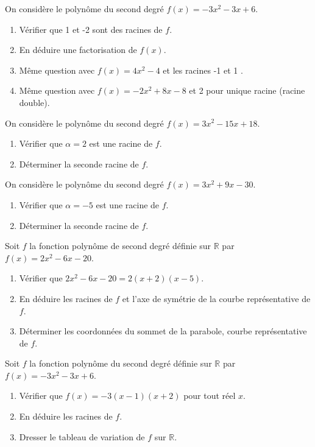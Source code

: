 \documentclass[french]{book}
\begin{document}
\begin{exocor}
On considère le polynôme du second degré $f(x)=-3 x^{2}-3 x+6$.

\begin{enumerate}
\item Vérifier que 1 et -2 sont des racines de $f$. 
\item En déduire une factorisation de $f(x)$.
\item Même question avec $f(x)=4 x^{2}-4$ et les racines -1 et 1 .
\item Même question avec $f(x)=-2 x^{2}+8 x-8$ et 2 pour unique racine (racine double).
\end{enumerate}
\end{exocor}

\begin{exocor}
On considère le polynôme du second degré $f(x)=3 x^{2}-15 x+18$.
\begin{enumerate}
\item Vérifier que $\alpha=2$ est une racine de $f$.
\item Déterminer la seconde racine de $f$.
\end{enumerate}
\end{exocor}

\begin{exocor}
On considère le polynôme du second degré $f(x)=3 x^{2}+9x-30$.
\begin{enumerate}
\item Vérifier que $\alpha=-5$ est une racine de $f$.
\item Déterminer la seconde racine de $f$.
\end{enumerate}
\end{exocor}

\begin{exocor}
Soit $f$ la fonction polynôme de second degré définie sur $\mathbb{R}$ par $f(x)=2 x^{2}-6 x-20$.

\begin{enumerate}
\item Vérifier que $2 x^{2}-6 x-20=2(x+2)(x-5)$.
\item En déduire les racines de $f$ et l'axe de symétrie de la courbe représentative de $f$.
\item Déterminer les coordonnées du sommet de la parabole, courbe représentative de $f$.
\end{enumerate}
\end{exocor}

\begin{exocor}
Soit $f$ la fonction polynôme du second degré définie sur $\mathbb{R}$ par $f(x)=-3 x^{2}-3 x+6$.

\begin{enumerate}
\item Vérifier que $f(x)=-3(x-1)(x+2)$ pour tout réel $x$.
\item En déduire les racines de $f$.
\item Dresser le tableau de variation de $f$ sur $\mathbb{R}$.
\end{enumerate}

\end{exocor}
\end{document}
